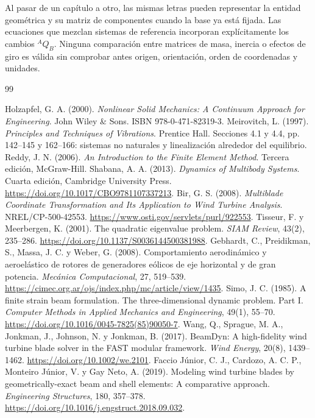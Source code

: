 \documentclass[11pt,a4paper,oneside]{report}
\begin{document}
Al pasar de un capítulo a otro, las mismas letras pueden representar la entidad geométrica y su matriz de componentes cuando la base ya está fijada. Las ecuaciones que mezclan sistemas de referencia incorporan explícitamente los cambios ${}^AQ_B$. Ninguna comparación entre matrices de masa, inercia o efectos de giro es válida sin comprobar antes origen, orientación, orden de coordenadas y unidades.
\normalsize
\begin{thebibliography}{99}
 Holzapfel, G. A. (2000). \emph{Nonlinear Solid Mechanics: A Continuum Approach for Engineering}. John Wiley \& Sons. ISBN 978-0-471-82319-3.
 Meirovitch, L. (1997). \emph{Principles and Techniques of Vibrations}. Prentice Hall. Secciones 4.1 y 4.4, pp. 142--145 y 162--166: sistemas no naturales y linealización alrededor del equilibrio.
 Reddy, J. N. (2006). \emph{An Introduction to the Finite Element Method}. Tercera edición, McGraw-Hill.
 Shabana, A. A. (2013). \emph{Dynamics of Multibody Systems}. Cuarta edición, Cambridge University Press. \url{https://doi.org/10.1017/CBO9781107337213}.
 Bir, G. S. (2008). \emph{Multiblade Coordinate Transformation and Its Application to Wind Turbine Analysis}. NREL/CP-500-42553. \url{https://www.osti.gov/servlets/purl/922553}.
 Tisseur, F. y Meerbergen, K. (2001). The quadratic eigenvalue problem. \emph{SIAM Review}, 43(2), 235--286. \url{https://doi.org/10.1137/S0036144500381988}.
 Gebhardt, C., Preidikman, S., Massa, J. C. y Weber, G. (2008). Comportamiento aerodinámico y aeroelástico de rotores de generadores eólicos de eje horizontal y de gran potencia. \emph{Mecánica Computacional}, 27, 519--539. \url{https://cimec.org.ar/ojs/index.php/mc/article/view/1435}.
 Simo, J. C. (1985). A finite strain beam formulation. The three-dimensional dynamic problem. Part I. \emph{Computer Methods in Applied Mechanics and Engineering}, 49(1), 55--70. \url{https://doi.org/10.1016/0045-7825(85)90050-7}.
 Wang, Q., Sprague, M. A., Jonkman, J., Johnson, N. y Jonkman, B. (2017). BeamDyn: A high-fidelity wind turbine blade solver in the FAST modular framework. \emph{Wind Energy}, 20(8), 1439--1462. \url{https://doi.org/10.1002/we.2101}.
 Faccio Júnior, C. J., Cardozo, A. C. P., Monteiro Júnior, V. y Gay Neto, A. (2019). Modeling wind turbine blades by geometrically-exact beam and shell elements: A comparative approach. \emph{Engineering Structures}, 180, 357--378. \url{https://doi.org/10.1016/j.engstruct.2018.09.032}.

\end{thebibliography}
\end{document}
